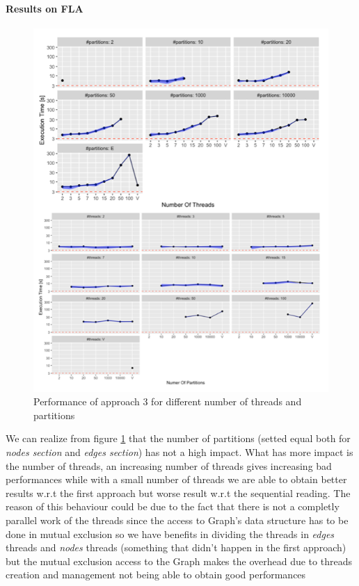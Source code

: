 \documentclass[twocolumn, switch]{article} %
\begin{document}
\paragraph{Results on FLA}
\begin{figure}[ht!]
  \centering
  \includegraphics[width=1\linewidth]{par_read_3_time.png}
  \caption{Performance of approach 3 for different number of threads and partitions}
  \label{parread3time}
\end{figure}
We can realize from figure \ref{parread3time} that the number of partitions (setted equal
both for \textit{nodes section} and \textit{edges section}) has not a high impact.
What has more impact is the number of threads, an increasing number of threads gives increasing
bad performances while with a small number of threads we are able to obtain better results
w.r.t the first approach but worse result w.r.t the sequential reading. The reason of this
behaviour could be due to the fact that there is not a completly parallel work of the threads
since the access to Graph's data structure has to be done in mutual exclusion so we 
have benefits in dividing the threads in \textit{edges} threads and \textit{nodes} threads (something
that didn't happen in the first approach) but the mutual exclusion access to the Graph
makes the overhead due to threads creation and management not being able to obtain good
performances
\end{document}
